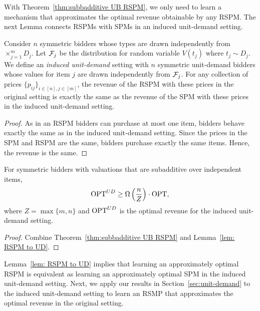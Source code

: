 With Theorem~\ref{thm:subbadditive UB RSPM}, we only need to learn a mechanism that approximates the optimal revenue obtainable by any RSPM. The next Lemma connects RSPMs with SPMs in an induced unit-demand setting.
\begin{lemma}\label{lem: RSPM to UD}
	Consider $n$ symmetric bidders whose types are drawn independently from $\times_{j=1}^m D_j$. Let ${\mathcal{F}}_j$ be the distribution for random variable $V(t_j)$ where $t_j\sim D_j$. We define an \emph{induced unit-demand} setting with  $n$ symmetric unit-demand bidders whose values for item $j$ are drawn independently from ${\mathcal{F}}_j$. For any collection of prices $\{p_{ij}\}_{i\in[n],j\in[m]}$, the revenue of the RSPM with these prices in the original setting is exactly the same as the revenue of the SPM with these prices in the induced unit-demand setting.
\end{lemma}
\begin{proof}
As in an RSPM bidders can purchase at most one item, bidders behave exactly the same as in the induced unit-demand setting. Since the prices in the SPM and RSPM are the same, bidders purchase exactly the same items. Hence, the revenue is the same.\end{proof}

\begin{corollary}\label{cor:subadditive to UD}
For symmetric bidders with valuations that are subadditive over independent items, $$\text{OPT}^{UD}\geq \Omega\left(\frac{n}{Z}\right)\cdot\text{OPT}, $$ where $Z=\max\{m,n\}$ and $\text{OPT}^{UD}$ is the optimal revenue for the induced unit-demand setting.\end{corollary}
\begin{proof}
	Combine Theorem~\ref{thm:subbadditive UB RSPM} and Lemma~\ref{lem: RSPM to UD}.
\end{proof}

Lemma~\ref{lem: RSPM to UD} implies that learning an approximately optimal RSPM is equivalent as learning an approximately optimal SPM in the induced unit-demand setting. Next, we apply our results in Section~\ref{sec:unit-demand} to the induced unit-demand setting to learn an RSMP that approximates the optimal revenue in the original setting.


